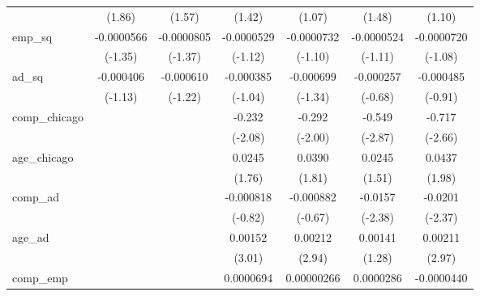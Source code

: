 {\begin{tabular}{l*{6}{c}}
            &      (1.86)         &      (1.57)         &      (1.42)         &      (1.07)         &      (1.48)         &      (1.10)         \\
[1em]
emp\_sq      &  -0.0000566         &  -0.0000805         &  -0.0000529         &  -0.0000732         &  -0.0000524         &  -0.0000720         \\
            &     (-1.35)         &     (-1.37)         &     (-1.12)         &     (-1.10)         &     (-1.11)         &     (-1.08)         \\
[1em]
ad\_sq       &   -0.000406         &   -0.000610         &   -0.000385         &   -0.000699         &   -0.000257         &   -0.000485         \\
            &     (-1.13)         &     (-1.22)         &     (-1.04)         &     (-1.34)         &     (-0.68)         &     (-0.91)         \\
[1em]
comp\_chicago&                     &                     &      -0.232\sym{*}  &      -0.292\sym{*}  &      -0.549\sym{**} &      -0.717\sym{**} \\
            &                     &                     &     (-2.08)         &     (-2.00)         &     (-2.87)         &     (-2.66)         \\
[1em]
age\_chicago &                     &                     &      0.0245         &      0.0390         &      0.0245         &      0.0437\sym{*}  \\
            &                     &                     &      (1.76)         &      (1.81)         &      (1.51)         &      (1.98)         \\
[1em]
comp\_ad     &                     &                     &   -0.000818         &   -0.000882         &     -0.0157\sym{*}  &     -0.0201\sym{*}  \\
            &                     &                     &     (-0.82)         &     (-0.67)         &     (-2.38)         &     (-2.37)         \\
[1em]
age\_ad      &                     &                     &     0.00152\sym{**} &     0.00212\sym{**} &     0.00141         &     0.00211\sym{**} \\
            &                     &                     &      (3.01)         &      (2.94)         &      (1.28)         &      (2.97)         \\
[1em]
comp\_emp    &                     &                     &   0.0000694         &  0.00000266         &   0.0000286         &  -0.0000440         \\

\end{tabular}}
